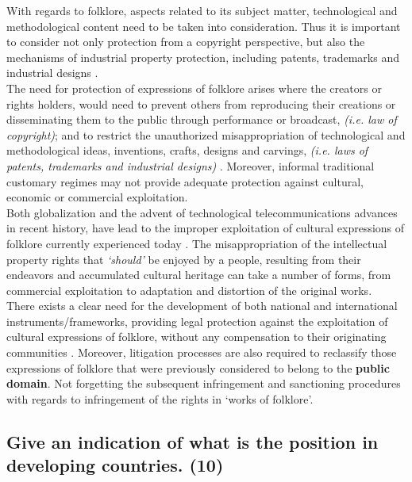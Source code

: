 \documentclass[11pt]{article}
\begin{document}
With regards to folklore, aspects related to its subject matter, technological
and methodological content need to be taken into consideration. Thus it is
important to consider not only protection from a copyright perspective, but also
the mechanisms of industrial property protection, including patents, trademarks
and industrial designs \cite{saurombe09_protection_indigenous_trad_knowl_through_ip}.\\

The need for protection of expressions of folklore arises where the creators or
rights holders, would need to prevent others from reproducing their creations or
disseminating them to the public through performance or broadcast, \emph{(i.e. law of
copyright)}; and to restrict the unauthorized misappropriation of technological
and methodological ideas, inventions, crafts, designs and carvings, \emph{(i.e. laws
of patents, trademarks and industrial designs)}
\cite{masango10_indigenous_trad_knowl_protect_prospects}. Moreover, informal
traditional customary regimes may not provide adequate protection against
cultural, economic or commercial exploitation.\\

Both globalization and the advent of technological telecommunications advances
in recent history, have lead to the improper exploitation of cultural
expressions of folklore currently experienced today \cite{geyer10_towards_clearer_defin_underst_indi}. The misappropriation of the
intellectual property rights that \emph{`should'} be enjoyed by a people, resulting
from their endeavors and accumulated cultural heritage can take a number of
forms, from commercial exploitation to adaptation and distortion of the original
works.\\

There exists a clear need for the development of both national and international
instruments/frameworks, providing legal protection against the exploitation of
cultural expressions of folklore, without any compensation to their originating
communities \cite{saurombe09_protection_indigenous_trad_knowl_through_ip}. Moreover, litigation processes are also required to reclassify
those expressions of folklore that were previously considered to belong to the
\textbf{public domain}. Not forgetting the subsequent infringement and sanctioning
procedures with regards to infringement of the rights in `works of folklore'.

\subsection{Give an indication of what is the position in developing countries. (10)}
\label{sec:orgd4aea81}
\end{document}
